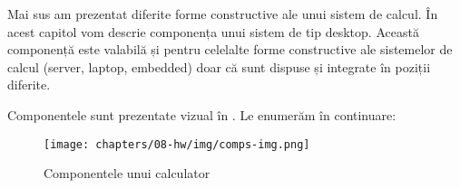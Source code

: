 Mai sus am prezentat diferite forme constructive ale unui sistem
de calcul. În acest capitol vom descrie componența unui sistem de tip desktop.
Această componență este valabilă și pentru celelalte forme constructive ale
sistemelor de calcul (server, laptop, embedded) doar că sunt dispuse și
integrate în poziții diferite.

Componentele sunt prezentate vizual în . Le enumerăm în continuare:

\begin{figure}[!htbp]
	\centering
	\texttt{[image: chapters/08-hw/img/comps-img.png]}
	\caption{Componentele unui calculator\protect\footnotemark}
	\label{fig:hw:components}
\end{figure}


